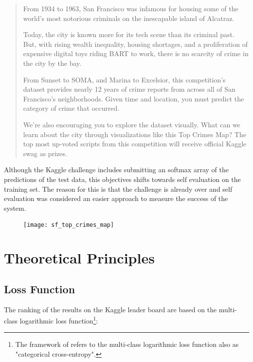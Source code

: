 \documentclass[12pt,a4paper]{scrartcl}
\begin{document}
\begin{quote}
From 1934 to 1963, San Francisco was infamous for housing some of the world's most notorious criminals on the inescapable island of Alcatraz.

Today, the city is known more for its tech scene than its criminal past. But, with rising wealth inequality, housing shortages, and a proliferation of expensive digital toys riding BART to work, there is no scarcity of crime in the city by the bay.

From Sunset to SOMA, and Marina to Excelsior, this competition's dataset provides nearly 12 years of crime reports from across all of San Francisco's neighborhoods. Given time and location, you must predict the category of crime that occurred.

We're also encouraging you to explore the dataset visually. What can we learn about the city through visualizations like this Top Crimes Map? The top most up-voted scripts from this competition will receive official Kaggle swag as prizes. 
\end{quote}

Although the Kaggle challenge includes submitting an softmax array of the predictions of the test data, this objectives shifts towards self evaluation on the training set. The reason for this is that the challenge is already over and self evaluation was considered an easier approach to measure the success of the system.

\begin{center}
\begin{figure}[htbp]\label{f:sf_crime_map}
\texttt{[image: sf\_top\_crimes\_map]}
\caption{\cite{sf_crime_map}}
\end{figure}
\end{center}

\pagebreak
\section{Theoretical Principles}\label{s:theoretical_principles}
\subsection{Loss Function}\label{ss:loss_function}
The ranking of the results on the Kaggle leader board\citep{kgl_sf_crime} are based on the multi-class logarithmic loss function\footnote{The framework of \cite{keras} refers to the multi-class logarithmic loss function also as "categorical cross-entropy".}:
\end{document}
